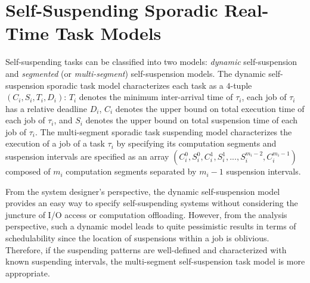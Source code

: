 \section{Self-Suspending Sporadic Real-Time Task Models}
  
Self-suspending tasks can be classified into two models: \emph{dynamic} self-suspension and \emph{segmented} (or \emph{multi-segment}) self-suspension models. 
The dynamic self-suspension sporadic task model characterizes each task as a $4$-tuple $(C_i,S_i,T_i,D_i)$: $T_i$ denotes the minimum inter-arrival time of $\tau_i$, each job of $\tau_i$ has a relative deadline $D_i$,
$C_i$ denotes the upper bound on total execution time of each job of $\tau_i$,
and $S_i$ denotes the upper bound on total suspension time of each job of $\tau_i$. The multi-segment sporadic task suspending model characterizes the execution of a job of a task $\tau_i$ by  specifying its computation segments and suspension intervals are specified as an array
$(C_{i}^0,S_{i}^0,C_{i}^1,S_{i}^1,...,S_{i}^{m_i-2},C_{i}^{m_i-1})$ composed of $m_i$ computation segments separated by $m_i-1$ suspension intervals. 

From the system designer's perspective, the dynamic self-suspension model provides an easy way to specify self-suspending systems without considering the juncture of I/O access or computation offloading. 
However, from the analysis perspective, such a  dynamic model leads to quite pessimistic results in terms of schedulability since the location of suspensions within a job is oblivious. Therefore, if the suspending patterns are well-defined and characterized with known suspending intervals, the multi-segment self-suspension task model is more appropriate.   
  
  
  